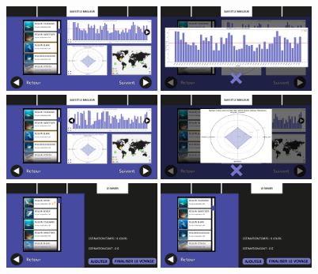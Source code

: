 \documentclass{article}
\begin{document}
\newpage
\begin{figure}[!h]

	\centering
	\includegraphics[width=0.45\textwidth]{assets/prototype/haute/Diapositive9}
	\hfill
	\includegraphics[width=0.45\textwidth]{assets/prototype/haute/Diapositive10}
	\includegraphics[width=0.45\textwidth]{assets/prototype/haute/Diapositive11}
	\hfill
	\includegraphics[width=0.45\textwidth]{assets/prototype/haute/Diapositive12}
	\includegraphics[width=0.45\textwidth]{assets/prototype/haute/Diapositive13}
	\hfill
	\includegraphics[width=0.45\textwidth]{assets/prototype/haute/Diapositive14}

\end{figure}
\end{document}
